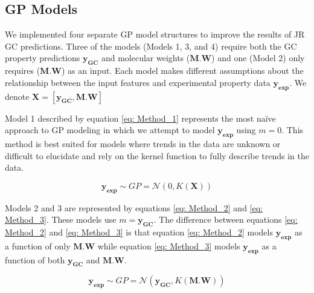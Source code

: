 \documentclass[journal=jacsat,manuscript=article]{achemso}
\begin{document}
\subsection{GP Models} 
\label{subsec:model_screening}
We implemented four separate GP model structures to improve the results of JR GC predictions. Three of the models (Models 1, 3, and 4) require both the GC property predictions $\mathbf{y_{GC}}$ and molecular weights ($\mathbf{M.W}$) and one (Model 2) only requires ($\mathbf{M.W}$) as an input. Each model makes different assumptions about the relationship between the input features and experimental property data $\mathbf{y_{\text{exp}}}$. We denote $\mathbf{X} = [\mathbf{y_{GC}}, \mathbf{M.W}]$

Model 1 described by equation \eqref{eq: Method_1} represents the most na\"ive approach to GP modeling in which we attempt to model $\mathbf{y_{\text{exp}}}$ using $m=0$. This method is best suited for models where trends in the data are unknown or difficult to elucidate and rely on the kernel function to fully describe trends in the data.


\begin{equation}
    \mathbf{y_{\text{exp}}} \sim  GP = \mathcal{N}\left(0, K(\mathbf{X}) \right)
    \label{eq: Method_1}
\end{equation}


Models 2 and 3 are represented by equations \ref{eq: Method_2} and \ref{eq: Method_3}. 
These models use $m = \mathbf{y_{GC}}$.
The difference between equations \ref{eq: Method_2} and \ref{eq: Method_3} is that equation \ref{eq: Method_2} models $\mathbf{y_{\text{exp}}}$ as a function of only $\mathbf{M.W}$ while equation \ref{eq: Method_3} models $\mathbf{y_{\text{exp}}}$ as a function of both $\mathbf{y_{GC}}$ and $\mathbf{M.W}$.

\begin{equation}
    \mathbf{y_{\text{exp}}} \sim GP = \mathcal{N}\left(\mathbf{y_{GC}}, K(\mathbf{M.W}) \right)
    \label{eq: Method_2}
\end{equation}
\end{document}
